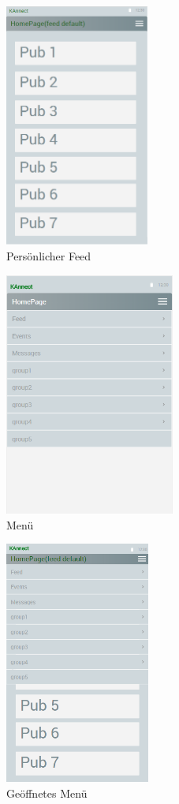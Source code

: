 \documentclass[parskip=full]{scrartcl}
\begin{document}
	\begin{figure}[H]
		\centering
		\includegraphics[height=8cm]{PFeed}
		\caption{Persönlicher Feed}
		\label{PersönlicherFeed}
		\hypertarget{PFeed}{}
	\end{figure}
	
	\begin{figure}[H]
		\centering
		\includegraphics[height=8cm]{Menu}
		\caption{Menü}
		\label{Menü}
	\end{figure}
	
	\begin{figure}[H]
		\centering
		\includegraphics[height=8cm]{MenuOpened}
		\caption{Geöffnetes Menü}
		\label{OffenesMenü}
	\end{figure}
	
\end{document}
